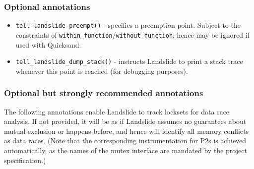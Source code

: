 \subsubsection{Optional annotations}

\begin{itemize}
	\item {\tt tell\_landslide\_preempt()} - specifies a preemption point.
		Subject to the constraints of {\tt within\_function}/{\tt without\_function};
		hence may be ignored if used with Quicksand.
	\item {\tt tell\_landslide\_dump\_stack()} - instructs Landslide to print a stack trace whenever this point is reached (for debugging purposes).
\end{itemize}

\subsubsection{Optional but strongly recommended annotations}

The following annotations enable Landslide to track locksets for data race analysis.
If not provided, it will be as if Landslide assumes no guarantees about mutual exclusion or happens-before,
and hence will identify all memory conflicts as data races.
(Note that the corresponding instrumentation for P2s is achieved automatically,
as the names of the mutex interface are mandated by the project specification.)


